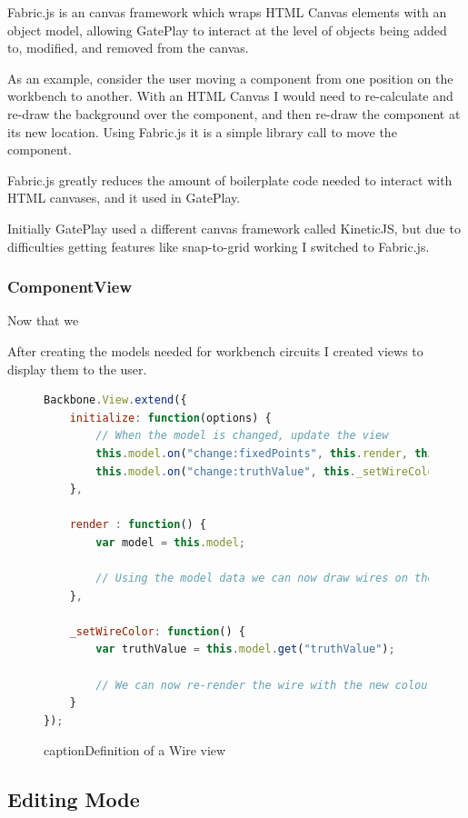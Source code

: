 Fabric.js is an canvas framework which wraps HTML Canvas elements with an object model, allowing GatePlay to interact at the level of objects being added to, modified, and removed from the canvas.

As an example, consider the user moving a component from one position on the workbench to another. With an HTML Canvas I would need to re-calculate and re-draw the background over the component, and then re-draw the component at its new location. Using Fabric.js it is a simple library call to move the component.

Fabric.js greatly reduces the amount of boilerplate code needed to interact with HTML canvases, and it used in GatePlay.

Initially GatePlay used a different canvas framework called KineticJS, but due to difficulties getting features like snap-to-grid working I switched to Fabric.js.

\subsubsection{ComponentView}
Now that we


After creating the models needed for workbench circuits I created views to display them to the user. 

\begin{figure}
\begin{lstlisting}[language=JavaScript]
Backbone.View.extend({
    initialize: function(options) {
        // When the model is changed, update the view
        this.model.on("change:fixedPoints", this.render, this);
        this.model.on("change:truthValue", this._setWireColor, this);
    },

    render : function() {
        var model = this.model;
		
		// Using the model data we can now draw wires on the canvas
    },

    _setWireColor: function() {
        var truthValue = this.model.get("truthValue");
        
        // We can now re-render the wire with the new colour
    }
});
\end{lstlisting}
caption{Definition of a Wire view}
\label{fig:wireview}
\end{figure}

\subsection{Editing Mode}

